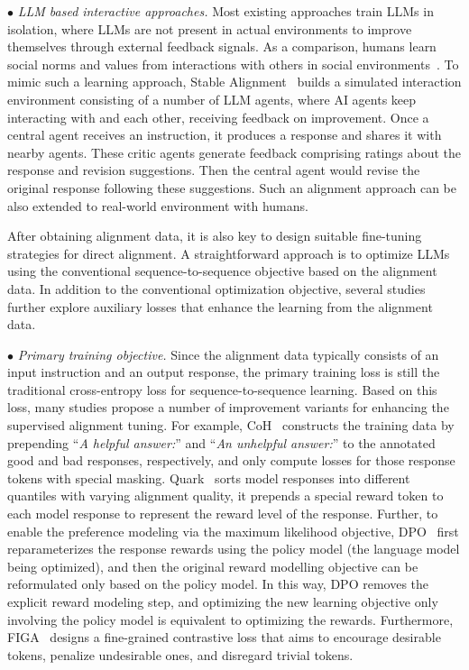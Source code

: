 {{$\bullet$ {\textit{LLM based interactive approaches.} Most existing approaches train LLMs in isolation, where LLMs are not present in actual  environments to improve themselves through external feedback signals. As a comparison, humans learn social norms and values from interactions with others in social environments~\cite{Krishna-PNAS-2022-Socially}. To mimic such a learning approach, Stable Alignment~\cite{Liu-arxiv-2023-training} builds a simulated interaction environment  consisting of a number of LLM agents, where AI agents keep interacting with and  each other, receiving feedback on improvement.  
Once a central agent receives an instruction, it produces a response and shares it with nearby agents. These critic  agents generate feedback comprising ratings about the response and revision  suggestions. Then the central agent would revise the original response following these suggestions. %
}
Such an alignment approach can be also extended to real-world environment with humans. 
 
 {After obtaining alignment data,} it is also key to design suitable fine-tuning strategies for direct alignment. A straightforward approach is to optimize LLMs  using the conventional sequence-to-sequence objective based on the alignment data. 
In addition to the conventional optimization objective, several studies further explore auxiliary losses that enhance the learning from the alignment data.}

$\bullet$ \textit{Primary training objective.} Since the alignment data typically consists of an input instruction and an output response, the primary training loss is still the traditional cross-entropy loss for sequence-to-sequence learning. Based on this loss, many studies propose a number of improvement variants for enhancing the supervised alignment tuning. For example, CoH~\cite{Liu-arxiv-2023-Chain} constructs the training data by prepending ``\emph{A helpful answer:}'' and ``\emph{An unhelpful answer:}'' to the annotated good and bad responses, respectively, and only compute losses for those response tokens with special masking.  Quark~\cite{Lu-nips-2022-quark} sorts model responses into different quantiles with varying alignment quality, it prepends a special reward token to each model response to represent the reward level of the response. Further, to enable the preference modeling via the maximum likelihood objective, DPO~\cite{Rafailov-arxiv-2023-Direct} first reparameterizes the response rewards using the policy model (\ie the language model being optimized), and then the original reward modelling objective can be reformulated only based on the policy model. In this way, DPO removes the explicit reward modeling step, and optimizing the new learning objective only involving the policy model is equivalent to optimizing the rewards. 
{Furthermore, FIGA~\cite{Guo-arxiv-2023-Beyond} designs a fine-grained contrastive loss that aims to encourage desirable tokens, penalize undesirable ones, and disregard trivial tokens.}


}
